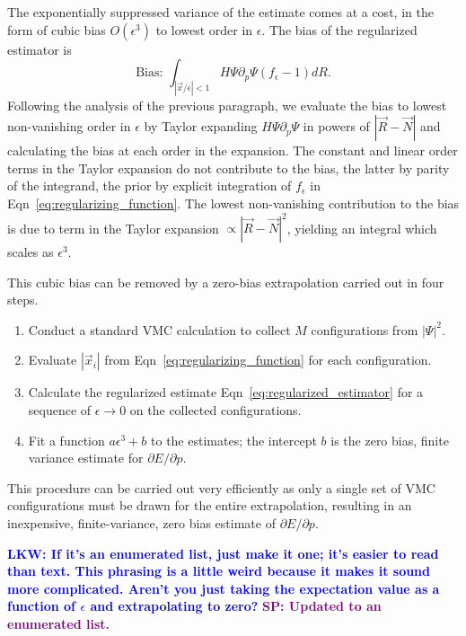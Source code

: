 \documentclass[twocolumn]{revtex4-1}
\newcommand{\lucas}[1]{\textbf{\textcolor{blue}{LKW: #1}}}
\newcommand{\shivesh}[1]{\textbf{\textcolor{purple}{SP: #1}}}
\begin{document}
The exponentially suppressed variance of the estimate comes at a cost, in the form of cubic bias $O(\epsilon^3)$ to lowest order in $\epsilon$.
The bias of the regularized estimator is
\begin{equation}
\text{Bias: } \int_{|\vec{x}/\epsilon|< 1} H\Psi \partial_p \Psi (f_\epsilon - 1) dR.
\label{eq:estimator_bias}
\end{equation}
Following the analysis of the previous paragraph, we evaluate the bias to lowest non-vanishing order in $\epsilon$ by Taylor expanding $H\Psi \partial_p\Psi$ in powers of $|\vec{R} - \vec{N}|$ and calculating the bias at each order in the expansion.
The constant and linear order terms in the Taylor expansion do not contribute to the bias, the latter by parity of the integrand, the prior by explicit integration of $f_\epsilon$ in Eqn~\ref{eq:regularizing_function}.
The lowest non-vanishing contribution to the bias is due to term in the Taylor expansion $\propto |\vec{R} - \vec{N}|^2$, yielding an integral which scales as $\epsilon^3$.

This cubic bias can be removed by a zero-bias extrapolation carried out in four steps.
\begin{enumerate}
\item Conduct a standard VMC calculation to collect $M$ configurations from $|\Psi|^2$.
\item Evaluate $|\vec{x}_i|$ from Eqn~\ref{eq:regularizing_function} for each configuration.
\item Calculate the regularized estimate Eqn~\ref{eq:regularized_estimator} for a sequence of $\epsilon \rightarrow 0$ on the collected configurations.
\item Fit a function $a\epsilon^3 + b$ to the estimates; the intercept $b$ is the zero bias, finite variance estimate for $\partial E/\partial p$.
\end{enumerate}
This procedure can be carried out very efficiently as only a single set of VMC configurations must be drawn for the entire extrapolation, resulting in an inexpensive, finite-variance, zero bias estimate of $\partial E/\partial p$.

\lucas{If it's an enumerated list, just make it one; it's easier to read than text. This phrasing is a little weird because it makes it sound more complicated. Aren't you just taking the expectation value as a function of $\epsilon$ and extrapolating to zero?} 
\shivesh{Updated to an enumerated list.}
\end{document}
